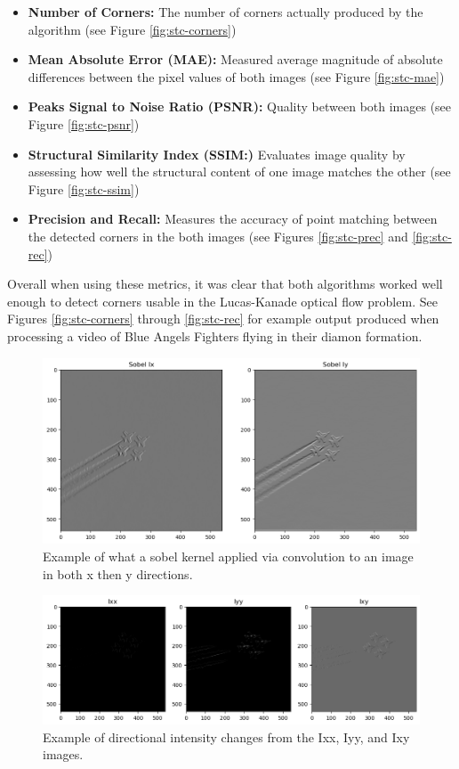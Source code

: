 \documentclass[11pt, conference, letterpaper]{IEEEtran}
\begin{document}
\begin{itemize}
    \item \textbf{Number of Corners:} The number of corners actually produced by the algorithm (see Figure \ref{fig:stc-corners})
    \item \textbf{Mean Absolute Error (MAE):} Measured average magnitude of absolute differences between the pixel values of both images (see Figure \ref{fig:stc-mae})
    \item \textbf{Peaks Signal to Noise Ratio (PSNR):} Quality between both images (see Figure \ref{fig:stc-psnr})
    \item \textbf{Structural Similarity Index (SSIM:)} Evaluates image quality by assessing how well the structural content of one image matches the other (see Figure \ref{fig:stc-ssim})
    \item \textbf{Precision and Recall:} Measures the accuracy of point matching between the detected corners in the both images (see Figures \ref{fig:stc-prec} and \ref{fig:stc-rec})
\end{itemize}

Overall when using these metrics, it was clear that both algorithms worked well enough to detect corners usable in the Lucas-Kanade optical flow problem. See Figures \ref{fig:stc-corners} through \ref{fig:stc-rec} for example output produced when processing a video of Blue Angels Fighters flying in their diamon formation.

\onecolumn
\begin{figure}[t]
    \centering
    \includegraphics[width=0.6\linewidth]{images/gradients_sample.png}
    \caption{Example of what a sobel kernel applied via convolution to an image in both x then y directions.}
    \label{fig:sobel_gradient}
\end{figure}

\begin{figure}[t]
    \centering
    \includegraphics[width=0.95\linewidth]{images/pre_gaussian_low_pass_filters.png}
    \caption{Example of directional intensity changes from the Ixx, Iyy, and Ixy images.}
    \label{fig:pre_gaussian_lpf}
\end{figure}
\end{document}
